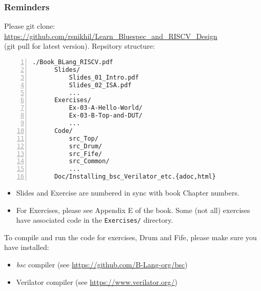 

\begin{frame}[fragile]
\frametitle{Reminders}

\footnotesize

Please git clone: \url{https://github.com/rsnikhil/Learn_Bluespec_and_RISCV_Design} \\
(git pull for latest version).  Repsitory structure:

\vspace{1ex}

\begin{minipage}{0.5\textwidth}\scriptsize
\begin{Verbatim}[frame=single, numbers=left]
    ./Book_BLang_RISCV.pdf
      Slides/
          Slides_01_Intro.pdf
          Slides_02_ISA.pdf
          ...
      Exercises/
          Ex-03-A-Hello-World/
          Ex-03-B-Top-and-DUT/
          ...
      Code/
          src_Top/
          src_Drum/
          src_Fife/
          src_Common/
          ...
      Doc/Installing_bsc_Verilator_etc.{adoc,html}
\end{Verbatim}
\end{minipage}
\hm
\begin{minipage}{0.45\textwidth}
\begin{itemize}

 \item Slides and Exercise are numbered in sync with book Chapter numbers.

 \item For Exercises, please see Appendix E of the book.  Some (not
       all) exercises have associated code in the {\tt Exercises/}
       directory.

\end{itemize}
\end{minipage}

\vspace{2ex}

To compile and run the code for exercises, Drum and Fife, please make sure you have installed:

\begin{itemize}

 \item \emph{bsc} compiler (see \url{https://github.com/B-Lang-org/bsc})

 \item Verilator compiler (see \url{https://www.verilator.org/})
\end{itemize}

\footnotesize

\end{frame}

